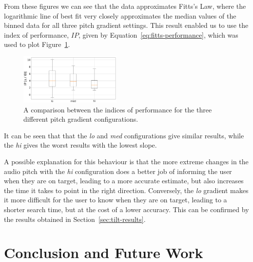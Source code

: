 \documentclass[format=sigconf, review=true, screen=true, anonymous=true]{acmart}
\begin{document}
From these figures we can see that the data approximates Fitts's Law, where the logarithmic line of best fit very closely approximates the median values of the binned data for all three pitch gradient settings. This result enabled us to use the index of performance, $IP$, given by Equation~\ref{eq:fitts-performance}, which was used to plot Figure~\ref{fig:fitts-performance}. %

\begin{figure}
  \centering
  \includegraphics[width=0.45\textwidth]{figures/fitts_performance.png}
  \caption{A comparison between the indices of performance for the three different pitch gradient configurations.}
  \label{fig:fitts-performance}
\end{figure}

It can be seen that that the \emph{lo} and \emph{med} configurations give similar results, while the \emph{hi} gives the worst results with the lowest slope. %

A possible explanation for this behaviour is that the more extreme changes in the audio pitch with the \emph{hi} configuration does a better job of informing the user when they are on target, leading to a more accurate estimate, but also increases the time it takes to point in the right direction. Conversely, the \emph{lo} gradient makes it more difficult for the user to know when they are on target, leading to a shorter search time, but at the cost of a lower accuracy. This can be confirmed by the results obtained in Section~\ref{sec:tilt-results}. 

\section{Conclusion and Future Work}
\label{sec:conclusion}
\end{document}
